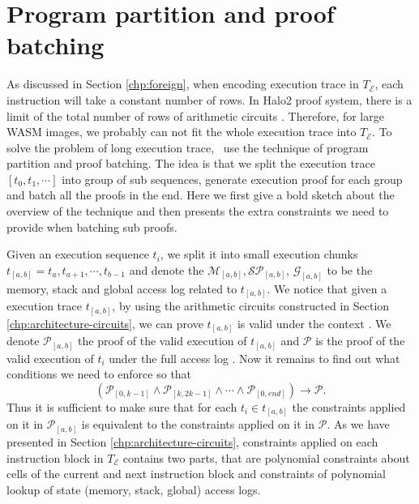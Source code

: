 \section{Program partition and proof batching}
\label{chp:sharding-batching}
As discussed in Section \ref{chp:foreign}, when encoding execution trace in $T_\mathcal{E}$, each instruction will take a constant number of rows. In Halo2 proof system, there is a limit of the total number of rows of arithmetic circuits \cite{halo2book}. Therefore, for large WASM images, we probably can not fit the whole execution trace into $T_\mathcal{E}$. To solve the problem of long execution trace,  \zkwasm\, use the technique of program partition and proof batching. The idea is that we split the execution trace $\left[t_0,t_1,\cdots\right]$ into group of sub sequences, generate execution proof for each group and batch all the proofs in the end. Here we first give a bold sketch about the overview of the technique and then presents the extra constraints we need to provide when batching sub proofs.

\smallskip Given an execution sequence $t_i$, we split it into small execution chunks $t_{[a,b]} = {t_a, t_{a+1}, \cdots, t_{b-1}}$ and denote the $\mathcal{M}_{[a,b]}, \mathcal{SP}_{[a,b]}$, $\mathcal{G}_{[a,b]}$ to be the memory, stack and global access log related to $t_{[a,b]}$. We notice that given a execution trace $t_{[a,b]}$, by using the arithmetic circuits constructed in Section \ref{chp:architecture-circuits}, we can prove $t_{[a,b]}$ is valid under the context . We denote $\mathcal{P}_{[a,b]}$ the proof of the valid execution of $t_{[a,b]}$ and $\mathcal{P}$ is the proof of the valid execution of $t_i$ under the full access log \fullstate. Now it remains to find out what conditions we need to enforce so that
\[
   (\mathcal{P}_{[0,k-1]} \wedge   \mathcal{P}_{[k,2k-1]} \wedge \cdots \wedge   \mathcal{P}_{[0,end]}) \rightarrow
     \mathcal{P}.
\]
\noindent Thus it is sufficient to make sure that for each $t_i \in t_{[a,b]}$ the constraints applied on it in $\mathcal{P}_{[a,b]}$ is equivalent to the constraints applied on it in $\mathcal{P}$. As we have presented in Section \ref{chp:architecture-circuits}, constraints applied on each instruction block in $T_\mathcal{E}$ contains two parts, that are polynomial constraints about cells of the current and next instruction block and constraints of polynomial lookup of state (memory, stack, global) access logs.\\

